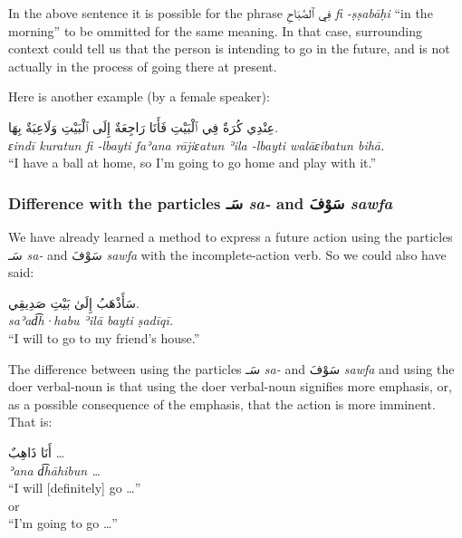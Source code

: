 \documentclass[
  10pt,
]{book}
\begin{document}
In the above sentence it is possible for the phrase
\foreignlanguage{arabic}{فِي ٱلصَّبَاحِ}
\emph{fi -ṣṣabāḥi}
\enquote{in the morning}
to be ommitted for the same meaning. In that case, surrounding context could tell us that the person is intending to go in the future, and is not actually in the process of going there at present.

Here is another example (by a female speaker):

\foreignlanguage{arabic}{عِنْدِي کُرَةٌ فِي ٱلْبَيْتِ فَأَنَا رَاجِعَةٌ إِلَى ٱلْبَيْتِ وَلَاعِبَةٌ بِهَا.}\\
\emph{ɛindī kuratun fi -lbayti faʾana rājiɛatun ʾila -lbayti walāɛibatun bihā.}\\
\enquote{I have a ball at home, so I'm going to go home and play with it.}

\subsubsection{\texorpdfstring{Difference with the particles \foreignlanguage{arabic}{سَـ} \emph{sa-} and \foreignlanguage{arabic}{سَوْفَ} \emph{sawfa}}{Difference with the particles سَـ sa- and سَوْفَ sawfa}}\label{difference-with-the-particles-ux633ux640-sa--and-ux633ux648ux641-sawfa}

We have already learned a method to express a future action using the particles \foreignlanguage{arabic}{سَـ} \emph{sa-} and \foreignlanguage{arabic}{سَوْفَ} \emph{sawfa} with the incomplete-action verb. So we could also have said:

\foreignlanguage{arabic}{سَأَذْهَبُ إِلَىٰ بَيْتِ صَدِيقِي.}\\
\emph{saʾad͡h·habu ʾilā bayti ṣadīqī.}\\
\enquote{I will to go to my friend's house.}

The difference between using the particles \foreignlanguage{arabic}{سَـ} \emph{sa-} and \foreignlanguage{arabic}{سَوْفَ} \emph{sawfa} and using the doer verbal-noun is that using the doer verbal-noun signifies more emphasis, or, as a possible consequence of the emphasis, that the action is more imminent. That is:

\foreignlanguage{arabic}{أَنَا ذَاهِبٌ \ldots{}}\\
\emph{ʾana d͡hāhibun \ldots{}}\\
\enquote{I will {[}definitely{]} go \ldots{}}\\
or\\
\enquote{I'm going to go \ldots{}}
\end{document}
